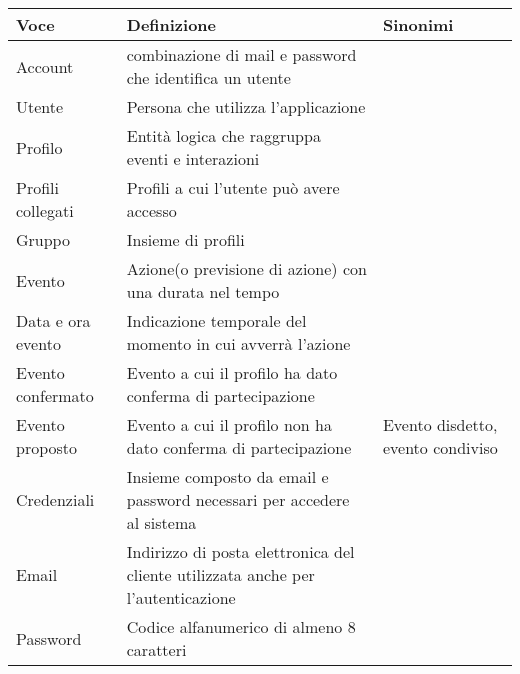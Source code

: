 \begin{tabular} {|P{3.5cm}|P{10.5cm}|P{3cm}|}
  \hline
  \textbf{Voce}     & \textbf{Definizione}                                                             & \textbf{Sinonimi}                 \\
  \hline
  Account           & combinazione di mail e password che identifica un utente                         &                                   \\
  \hline
  Utente            & Persona che utilizza l’applicazione                                              &                                   \\
  \hline
  Profilo           & Entità logica che raggruppa eventi e interazioni                                 &                                   \\
  \hline
  Profili collegati & Profili a cui l'utente può avere accesso                                         &                                   \\
  \hline
  Gruppo            & Insieme di profili                                                               &                                   \\
  \hline
  Evento            & Azione(o previsione di azione) con una durata nel tempo                          &                                   \\
  \hline
  Data e ora evento & Indicazione temporale del momento in cui avverrà l'azione                        &                                   \\
  \hline
  Evento confermato & Evento a cui il profilo ha dato conferma di partecipazione                       &                                   \\
  \hline
  Evento proposto   & Evento a cui il profilo non ha dato conferma di partecipazione                   & Evento disdetto, evento condiviso \\
  \hline
  Credenziali       & Insieme composto da email e password necessari per accedere al sistema           &                                   \\
  \hline
  Email             & Indirizzo di posta elettronica del cliente utilizzata anche per l'autenticazione &                                   \\
  \hline
  Password          & Codice alfanumerico di almeno 8 caratteri                                        &                                   \\
  \hline
\end{tabular}

